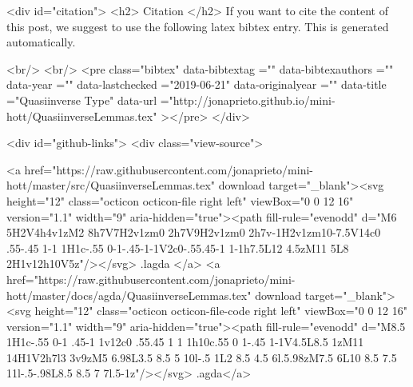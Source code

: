   
  <div id="citation">
  <h2> Citation </h2>
  If you want to cite the content of this post,
  we suggest to use the following latex bibtex entry.
  This is generated automatically.

  <br/>
  <br/>
  <pre class="bibtex"
       data-bibtextag =""
       data-bibtexauthors =""
       data-year =""
       data-lastchecked ="2019-06-21"
       data-originalyear =""
       data-title ="Quasiinverse Type"
       data-url ="http://jonaprieto.github.io/mini-hott/QuasiinverseLemmas.tex"
  ></pre>
  </div>
  

  <div id="github-links">
    <div class="view-source">
      
        <a href="https://raw.githubusercontent.com/jonaprieto/mini-hott/master/src/QuasiinverseLemmas.tex" download target="_blank"><svg height="12" class="octicon octicon-file right left" viewBox="0 0 12 16" version="1.1" width="9" aria-hidden="true"><path fill-rule="evenodd" d="M6 5H2V4h4v1zM2 8h7V7H2v1zm0 2h7V9H2v1zm0 2h7v-1H2v1zm10-7.5V14c0 .55-.45 1-1 1H1c-.55 0-1-.45-1-1V2c0-.55.45-1 1-1h7.5L12 4.5zM11 5L8 2H1v12h10V5z"/></svg> .lagda </a>
        <a href="https://raw.githubusercontent.com/jonaprieto/mini-hott/master/docs/agda/QuasiinverseLemmas.tex" download target="_blank"><svg height="12" class="octicon octicon-file-code right left" viewBox="0 0 12 16" version="1.1" width="9" aria-hidden="true"><path fill-rule="evenodd" d="M8.5 1H1c-.55 0-1 .45-1 1v12c0 .55.45 1 1 1h10c.55 0 1-.45 1-1V4.5L8.5 1zM11 14H1V2h7l3 3v9zM5 6.98L3.5 8.5 5 10l-.5 1L2 8.5 4.5 6l.5.98zM7.5 6L10 8.5 7.5 11l-.5-.98L8.5 8.5 7 7l.5-1z"/></svg> .agda</a>
      
